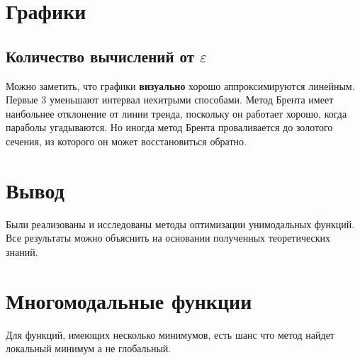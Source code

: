 \documentclass[russian, english]{article}
\begin{document}
\section{Графики}
\subsection{Количество вычислений от $\varepsilon$}

\par
Можно заметить, что графики \textbf{визуально} хорошо аппроксимируются линейным. Первые 3 уменьшают интервал нехитрыми способами. Метод Брента имеет наибольнее отклонение от линии тренда, поскольку он работает хорошо, когда параболы угадываются. Но иногда метод Брента проваливается до золотого сечения, из которого он может восстановиться обратно.
\par
{}
\par

\section{Вывод}
Были реализованы и исследованы методы оптимизации унимодальных функций. Все результаты можно объяснить на основании полученных теоретических знаний.

\section{Многомодальные функции}
Для функций, имеющих несколько минимумов, есть шанс что метод найдет локальный минимум а не глобальный.\par
\end{document}
